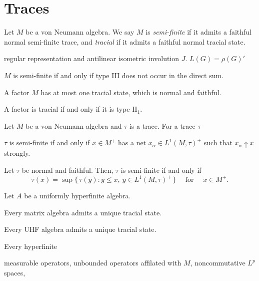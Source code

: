 \documentclass{../../large}
\begin{document}
\section{Traces}

\begin{prb}
Let $M$ be a von Neumann algebra.
We say $M$ is \emph{semi-finite} if it admits a faithful normal semi-finite trace, and \emph{tracial} if it admits a faithful normal tracial state.
\begin{parts}
\item regular representation and antilinear isometric involution $J$. $L(G)=\rho(G)'$
\item $M$ is semi-finite if and only if type III does not occur in the direct sum.

\item A factor $M$ has at most one tracial state, which is normal and faithful.
\item A factor is tracial if and only if it is type II$_1$.
\end{parts}
\end{prb}



\begin{prb}
Let $M$ be a von Neumann algebra and $\tau$ is a trace.
For a trace $\tau$
\begin{parts}
\item $\tau$ is semi-finite if and only if $x\in M^+$ has a net $x_\alpha\in L^1(M,\tau)^+$ such that $x_\alpha\uparrow x$ strongly.
\item Let $\tau$ be normal and faithful. Then, $\tau$ is semi-finite if and only if
\[\tau(x)=\sup\{\,\tau(y):y\le x,\ y\in L^1(M,\tau)^+\,\}\quad\text{ for }\quad x\in M^+.\]
\end{parts}
\end{prb}

\begin{prb}
Let $A$ be a uniformly hyperfinite algebra.
\begin{parts}
\item Every matrix algebra admits a unique tracial state.
\item Every UHF algebra admits a unique tracial state.
\item Every hyperfinite 
\end{parts}
\end{prb}


measurable operators,
unbounded operators affilated with $M$,
noncommutative $L^p$ spaces,
\end{document}

